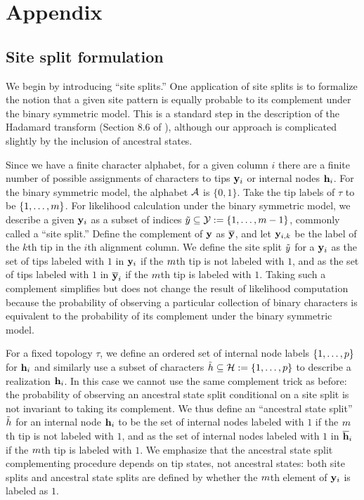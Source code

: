 \section*{Appendix}

\subsection*{Site split formulation}
We begin by introducing ``site splits.''
One application of site splits is to formalize the notion that a given site pattern is equally probable to its complement under the binary symmetric model.
This is a standard step in the description of the Hadamard transform (Section 8.6 of \citet{Semple2003-em}), although our approach is complicated slightly by the inclusion of ancestral states.

Since we have a finite character alphabet, for a given column $i$ there are a finite number of possible assignments of characters to tips $\mathbf{y}_i$ or internal nodes $\mathbf{h}_i$.
For the binary symmetric model, the alphabet $\mathcal{A}$ is $\{0,1\}$.
Take the tip labels of $\tau$ to be $\{1,\ldots,m\}$.
For likelihood calculation under the binary symmetric model, we describe a given $\mathbf{y}_i$ as a subset of indices $\tilde{y}\subseteq\mathcal{Y}:=\{1,\ldots,m-1\}$, commonly called a ``site split.''
Define the complement of $\mathbf{y}$ as $\overline{\mathbf{y}}$, and let $\mathbf{y}_{i,k}$ be the label of the $k$th tip in the $i$th alignment column.
We define the site split $\tilde{y}$ for a $\mathbf{y}_i$ as the set of tips labeled with $1$ in $\mathbf{y}_i$ if the $m$th tip is not labeled with $1$, and as the set of tips labeled with $1$ in $\overline{\mathbf{y}}_i$ if the $m$th tip is labeled with $1$.
Taking such a complement simplifies but does not change the result of likelihood computation because the probability of observing a particular collection of binary characters is equivalent to the probability of its complement under the binary symmetric model.

For a fixed topology $\tau$, we define an ordered set of internal node labels $\{1,\ldots,p\}$ for $\mathbf{h}_i$ and similarly use a subset of characters $\tilde{h}\subseteq\mathcal{H}:=\{1,\ldots,p\}$ to describe a realization $\mathbf{h}_i$.
In this case we cannot use the same complement trick as before: the probability of observing an ancestral state split conditional on a site split is not invariant to taking its complement.
We thus define an ``ancestral state split'' $\tilde{h}$ for an internal node $\mathbf{h}_i$ to be the set of internal nodes labeled with $1$ if the $m$th tip is not labeled with $1$, and as the set of internal nodes labeled with $1$ in $\overline{\mathbf{h}}_i$ if the $m$th tip is labeled with $1$.
We emphasize that the ancestral state split complementing procedure depends on tip states, not ancestral states: both site splits and ancestral state splits are defined by whether the $m$th element of $\mathbf{y}_i$ is labeled as $1$.

